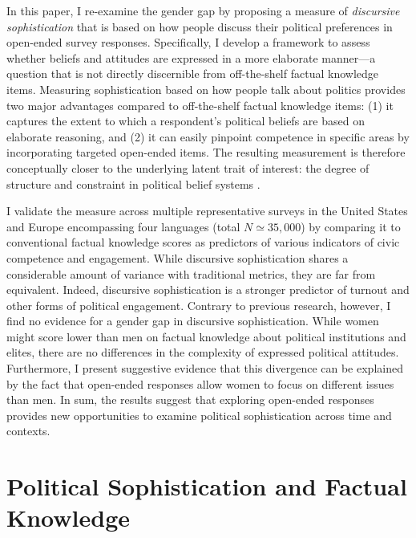 In this paper, I re-examine the gender gap by proposing a measure of \textit{discursive sophistication} that is based on how people discuss their political preferences in open-ended survey responses. Specifically, I develop a framework to assess whether beliefs and attitudes are expressed in a more elaborate manner---a question that is not directly discernible from off-the-shelf factual knowledge items. %
Measuring sophistication based on how people talk about politics provides two major advantages compared to off-the-shelf factual knowledge items: (1) it captures the extent to which a respondent's political beliefs are based on elaborate reasoning, and (2) it can easily pinpoint competence in specific areas by incorporating targeted open-ended items. The resulting measurement is therefore conceptually closer to the underlying latent trait of interest: the degree of structure and constraint in political belief systems \citep{tetlock1983cognitive,luskin1987measuring}.

I validate the measure across multiple representative surveys in the United States and Europe encompassing four languages (total $N \simeq 35,000$) by comparing it to conventional factual knowledge scores as predictors of various indicators of civic competence and engagement. While discursive sophistication shares a considerable amount of variance with traditional metrics, they are far from equivalent. Indeed, discursive sophistication is a stronger predictor of turnout and other forms of political engagement. Contrary to previous research, however, I find no evidence for a gender gap in discursive sophistication. While women might score lower than men on factual knowledge about political institutions and elites, there are no differences in the complexity of expressed political attitudes. Furthermore, I present suggestive evidence that this divergence can be explained by the fact that open-ended responses allow women to focus on different issues than men. In sum, the results suggest that exploring open-ended responses provides new opportunities to examine political sophistication across time and contexts.


\section*{Political Sophistication and Factual Knowledge}

